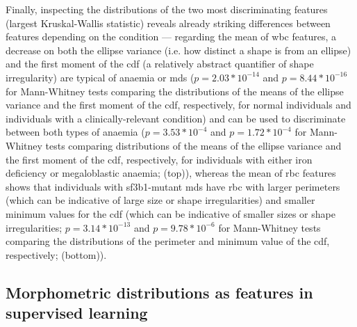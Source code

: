 \begin{figure}[!ht]
    \label{fig:dunn-test-heatmap}
\end{figure}

Finally, inspecting the distributions of the two most discriminating features (largest Kruskal-Wallis statistic) reveals already striking differences between features depending on the condition --- regarding the mean of \ac{wbc} features, a decrease on both the ellipse variance (i.e. how distinct a shape is from an ellipse) and the first moment of the \ac{cdf} (a relatively abstract quantifier of shape irregularity) are typical of anaemia or \ac{mds} ($p=2.03*10^{-14}$ and $p=8.44*10^{-16}$ for Mann-Whitney tests comparing the distributions of the means of the ellipse variance and the first moment of the \ac{cdf}, respectively, for normal individuals and individuals with a clinically-relevant condition) and can be used to discriminate between both types of anaemia ($p=3.53*10^{-4}$ and $p=1.72*10^{-4}$ for Mann-Whitney tests comparing distributions of the means of the ellipse variance and the first moment of the \ac{cdf}, respectively, for individuals with either iron deficiency or megaloblastic anaemia;  (top)), whereas the mean of \ac{rbc} features shows that individuals with \ac{sf3b1}-mutant \ac{mds} have \ac{rbc} with larger perimeters (which can be indicative of large size or shape irregularities) and smaller minimum values for the \ac{cdf} (which can be indicative of smaller sizes or shape irregularities; $p=3.14*10^{-13}$ and $p=9.78*10^{-6}$ for Mann-Whitney tests comparing the distributions of the perimeter and minimum value of the \ac{cdf}, respectively;  (bottom)).

\begin{figure}[!ht]
    \label{fig:feature-distribution-mean}
\end{figure}

\subsection{Morphometric distributions as features in supervised learning}


